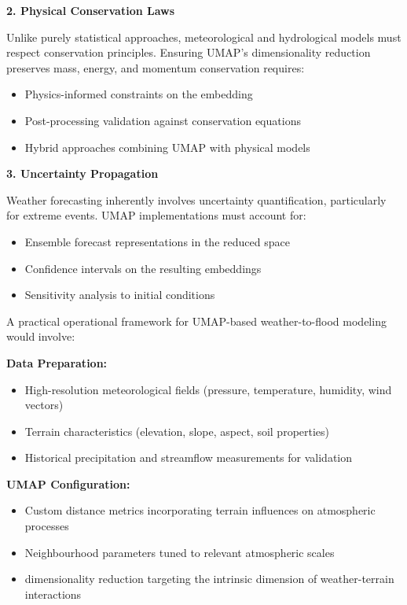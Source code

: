 \documentclass{article}
\begin{document}
\textbf{2. Physical Conservation Laws}

Unlike purely statistical approaches, meteorological and hydrological models must respect conservation principles. Ensuring UMAP's dimensionality reduction preserves mass, energy, and momentum conservation requires:
\begin{itemize}
	\item		Physics-informed constraints on the embedding
	\item		Post-processing validation against conservation equations
	\item		Hybrid approaches combining UMAP with physical models
\end{itemize}


\textbf{3. Uncertainty Propagation}

Weather forecasting inherently involves uncertainty quantification, particularly for extreme events. UMAP implementations must account for:
\begin{itemize}
	\item		Ensemble forecast representations in the reduced space
	\item		Confidence intervals on the resulting embeddings
	\item		Sensitivity analysis to initial conditions
\end{itemize}

A practical operational framework for UMAP-based weather-to-flood modeling would involve:

\textbf{Data Preparation:}

\begin{itemize}
	\item		High-resolution meteorological fields (pressure, temperature, humidity, wind vectors)
	\item		Terrain characteristics (elevation, slope, aspect, soil properties)
	\item		Historical precipitation and streamflow measurements for validation
\end{itemize}

\textbf{UMAP Configuration:}

\begin{itemize}
	\item		Custom distance metrics incorporating terrain influences on atmospheric processes
	\item		Neighbourhood parameters tuned to relevant atmospheric scales
	\item		dimensionality reduction targeting the intrinsic dimension of weather-terrain interactions
\end{itemize}
\end{document}
